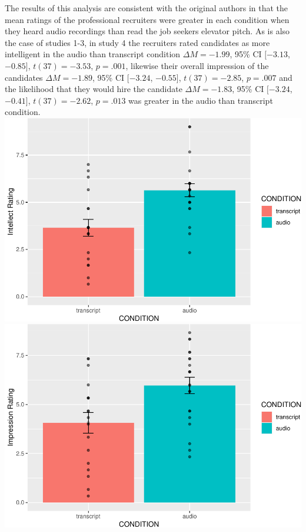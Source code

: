 \documentclass[
  english,
  man]{apa6}
\begin{document}
The results of this analysis are consistent with the original authors in that the mean ratings of the professional recruiters were greater in each condition when they heard audio recordings than read the job seekers elevator pitch. As is also the case of studies 1-3, in study 4 the recruiters rated candidates as more intelligent in the audio than transcript condition \(\Delta M = -1.99\), 95\% CI \([-3.13\), \(-0.85]\), \(t(37) = -3.53\), \(p = .001\), likewise their overall impression of the candidates \(\Delta M = -1.89\), 95\% CI \([-3.24\), \(-0.55]\), \(t(37) = -2.85\), \(p = .007\) and the likelihood that they would hire the candidate \(\Delta M = -1.83\), 95\% CI \([-3.24\), \(-0.41]\), \(t(37) = -2.62\), \(p = .013\) was greater in the audio than transcript condition.
\includegraphics{CSF-semester-project_files/figure-latex/unnamed-chunk-2-1.pdf}
\includegraphics{CSF-semester-project_files/figure-latex/unnamed-chunk-3-1.pdf}
\end{document}
